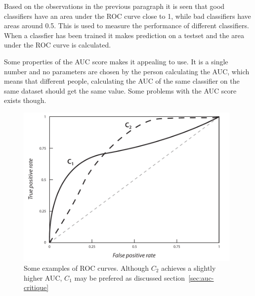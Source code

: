 Based on the observations in the previous paragraph it is seen that good classifiers have an area under the ROC curve close to 1, while bad classifiers have areas around 0.5. This is used to measure the performance of different classifiers. When a classfier has been trained it makes prediction on a testset and the area under the ROC curve is calculated. \par
Some properties of the AUC score makes it appealing to use. It is a single number and no parameters are chosen by the person calculating the AUC, which means that different people, calculating the AUC of the same classifier on the same dataset should get the same value. Some problems with the AUC score exists though.
\begin{figure}[ht]
    \centering
    \includegraphics[width=110mm]{media/roc.pdf}
    \caption{Some examples of ROC curves. Although $C_2$ achieves a slightly higher AUC, $C_1$ may be prefered as discussed section~\ref{sec:auc-critique}}\label{fig:example-rocs}
\end{figure}

